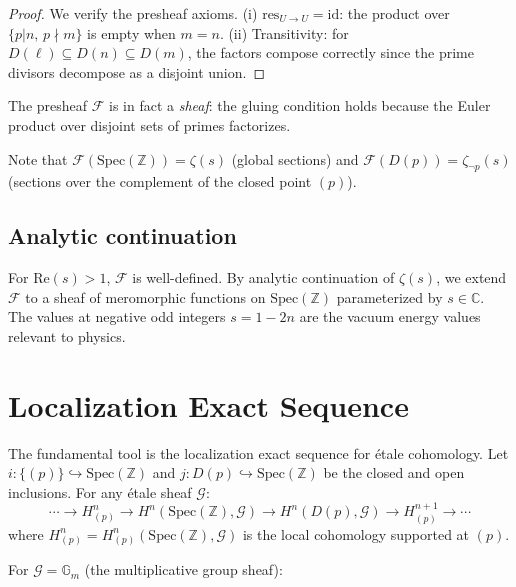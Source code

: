 \documentclass[aps,prd,twocolumn,superscriptaddress,nofootinbib]{revtex4-2}
\newcommand{\Spec}{\mathrm{Spec}}
\newcommand{\Gm}{\mathbb{G}_m}
\begin{document}
\begin{proof}
We verify the presheaf axioms. (i) $\mathrm{res}_{U \to U} = \mathrm{id}$:
the product over $\{p | n,\, p \nmid m\}$ is empty when $m = n$.
(ii) Transitivity: for $D(\ell) \subseteq D(n) \subseteq D(m)$,
the factors compose correctly since the prime divisors decompose
as a disjoint union.
\end{proof}

The presheaf $\mathcal{F}$ is in fact a \emph{sheaf}: the gluing
condition holds because the Euler product over disjoint sets of
primes factorizes.

Note that $\mathcal{F}(\Spec(\mathbb{Z})) = \zeta(s)$ (global sections)
and $\mathcal{F}(D(p)) = \zeta_{\neg p}(s)$ (sections over the
complement of the closed point $(p)$).

\subsection{Analytic continuation}

For $\mathrm{Re}(s) > 1$, $\mathcal{F}$ is well-defined.
By analytic continuation of $\zeta(s)$, we extend $\mathcal{F}$
to a sheaf of meromorphic functions on $\Spec(\mathbb{Z})$
parameterized by $s \in \mathbb{C}$.
The values at negative odd integers $s = 1 - 2n$ are the
vacuum energy values relevant to physics.

\section{Localization Exact Sequence}
\label{sec:localization}

The fundamental tool is the localization exact sequence for
\'etale cohomology. Let $i: \{(p)\} \hookrightarrow \Spec(\mathbb{Z})$
and $j: D(p) \hookrightarrow \Spec(\mathbb{Z})$ be the
closed and open inclusions. For any \'etale sheaf $\mathcal{G}$:
\begin{equation}
  \cdots \to H^n_{(p)} \to H^n(\Spec(\mathbb{Z}), \mathcal{G})
  \to H^n(D(p), \mathcal{G}) \to H^{n+1}_{(p)} \to \cdots
  \label{eq:les}
\end{equation}
where $H^n_{(p)} = H^n_{(p)}(\Spec(\mathbb{Z}), \mathcal{G})$
is the local cohomology supported at $(p)$.

For $\mathcal{G} = \Gm$ (the multiplicative group sheaf):
\end{document}
